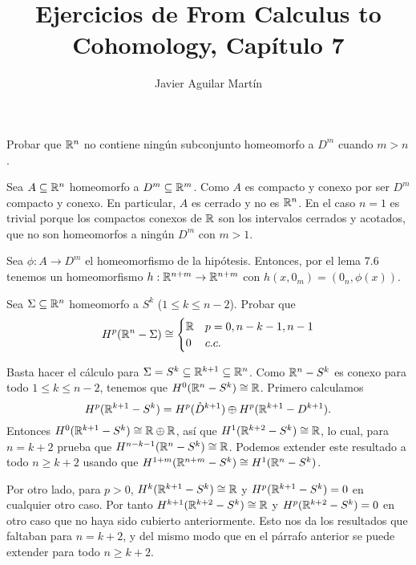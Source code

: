 \documentclass[twoside]{article}
\begin{document}
\title{Ejercicios de From Calculus to Cohomology, Capítulo 7}
\author{Javier Aguilar Martín}
\maketitle


\begin{ejercicio}{7.1}
 Probar que $\mathbb{R}^n$ no contiene ningún subconjunto homeomorfo a $D^m$ cuando $m>n$.
\end{ejercicio}
\begin{solucion}
Sea $A\subseteq \mathbb{R}^n$ homeomorfo a $D^m\subseteq\mathbb{R}^m$. Como $A$ es compacto y conexo por ser $D^m$ compacto y conexo. En particular, $A$ es cerrado y no es $\mathbb{R}^n$. En el caso $n=1$ es trivial porque los compactos conexos de $\mathbb{R}$ son los intervalos cerrados y acotados, que no son homeomorfos a ningún $D^m$ con $m>1$.

Sea $\phi:A\to D^m$ el homeomorfismo de la hipótesis. Entonces, por el lema 7.6 tenemos un homeomorfismo $h:\mathbb{R}^{n+m}\to\mathbb{R}^{n+m}$ con $h(x,0_m)=(0_n,\phi(x))$. 


\end{solucion}

\newpage

\begin{ejercicio}{7.2}
Sea $\Sigma\subseteq\mathbb{R}^n$ homeomorfo a $S^k$ ($1\leq k\leq n-2$). Probar que
\[
H^p(\mathbb{R}^n-\Sigma)\cong\begin{cases}
\mathbb{R}& p=0,n-k-1,n-1\\
0 & c.c.
\end{cases}
\]
\end{ejercicio}
\begin{solucion}
Basta hacer el cálculo para $\Sigma=S^k\subseteq\mathbb{R}^{k+1}\subseteq\mathbb{R}^n$. Como $\mathbb{R}^n-S^k$ es conexo para todo $1\leq k\leq n-2$, tenemos que $H^0(\mathbb{R}^n-S^k)\cong\mathbb{R}$. Primero calculamos
\[
H^p(\mathbb{R}^{k+1}-S^k)=H^p(\mathring{D}^{k+1})\oplus H^p(\mathbb{R}^{k+1}-D^{k+1}).
\]
Entonces $H^0(\mathbb{R}^{k+1}-S^k)\cong \mathbb{R}\oplus\mathbb{R}$, así que $H^1(\mathbb{R}^{k+2}-S^k)\cong\mathbb{R}$, lo cual, para $n=k+2$ prueba que $H^{n-k-1}(\mathbb{R}^n-S^k)\cong\mathbb{R}$. Podemos extender este resultado a todo $n\geq k+2$ usando que $H^{1+m}(\mathbb{R}^{n+m}-S^k)\cong H^1(\mathbb{R}^n-S^k)$. 

Por otro lado, para $p>0$, $H^k(\mathbb{R}^{k+1}-S^k)\cong \mathbb{R}$ y $H^p(\mathbb{R}^{k+1}-S^k)=0$ en cualquier otro caso. Por tanto $H^{k+1}(\mathbb{R}^{k+2}-S^k)\cong \mathbb{R}$ y $H^p(\mathbb{R}^{k+2}-S^k)=0$ en otro caso que no haya sido cubierto anteriormente.  Esto nos da los resultados que faltaban para $n=k+2$, y del mismo modo que en el párrafo anterior se puede extender para todo $n\geq k+2$.
\end{solucion}
\newpage
\end{document}
